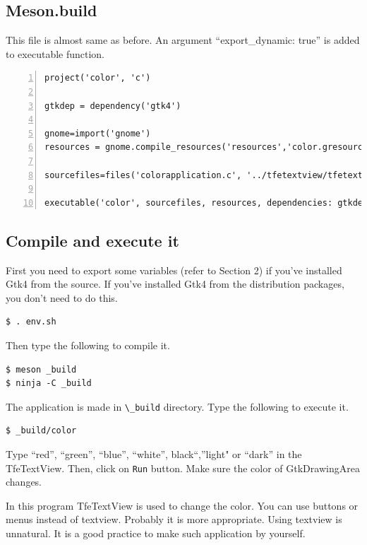 \hypertarget{meson.build}{%
\subsection{Meson.build}\label{meson.build}}

This file is almost same as before. An argument ``export\_dynamic:
true'' is added to executable function.

\begin{lstlisting}[numbers=left]
project('color', 'c')

gtkdep = dependency('gtk4')

gnome=import('gnome')
resources = gnome.compile_resources('resources','color.gresource.xml')

sourcefiles=files('colorapplication.c', '../tfetextview/tfetextview.c')

executable('color', sourcefiles, resources, dependencies: gtkdep, export_dynamic: true)
\end{lstlisting}

\hypertarget{compile-and-execute-it}{%
\subsection{Compile and execute it}\label{compile-and-execute-it}}

First you need to export some variables (refer to Section 2) if you've
installed Gtk4 from the source. If you've installed Gtk4 from the
distribution packages, you don't need to do this.

\begin{lstlisting}
$ . env.sh
\end{lstlisting}

Then type the following to compile it.

\begin{lstlisting}
$ meson _build
$ ninja -C _build
\end{lstlisting}

The application is made in \passthrough{\lstinline!\_build!} directory.
Type the following to execute it.

\begin{lstlisting}
$ _build/color
\end{lstlisting}

Type ``red'', ``green'', ``blue'', ``white'', black``,''light" or
``dark'' in the TfeTextView. Then, click on
\passthrough{\lstinline!Run!} button. Make sure the color of
GtkDrawingArea changes.

In this program TfeTextView is used to change the color. You can use
buttons or menus instead of textview. Probably it is more appropriate.
Using textview is unnatural. It is a good practice to make such
application by yourself.
